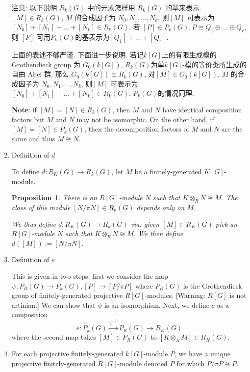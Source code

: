 \documentclass[UTF8]{ctexart}
\newtheorem*{prop}{Proposition}
\begin{document}
\begin{enumerate}
注意: 以下说明 $R_k(G)$ 中的元素怎样用 $R_k(G)$ 的基来表示. $[M]\in R_k(G)$, $M$ 的合成因子为 $N_0,N_1,\ldots,N_k$, 则$[M]$ 可表示为 $[N_0] + [N_1] +\ldots+[N_k]\in R_k(G)$.
若 $[P]\in P_k(G), P\cong Q_1\oplus \ldots\oplus Q_r$, 则 $[P]$ 可用$P_k(G)$的基表示为$[Q_1] + \dots + [Q_r]$.

上面的表述不够严谨. 下面进一步说明. 若记$k[G]$上的有限生成模的 Grothendieck group 为 $G_0(k[G])$,
$R_k(G)$为单$k[G]$-模的等价类所生成的自由 Abel 群, 那么 $G_0(k[G])\cong R_k(G)$, 对$[M]\in G_0(k[G])$, $M$ 的合成因子为 $N_0,N_1,\ldots,N_k$, 则$[M]$ 可表示为 $[N_0] + [N_1] +\ldots+[N_k]\in R_k(G)$.\cite{exact-sequences-and-the-grothendieck-group}
$P_k(G)$的情况同理.\cite{projective-modules-and-the-grothendieck-group}

\textbf{Note}: if $[M] = [N] \in R_k(G)$, then $M$ and $N$ have identical composition factors but $M$ and $N$ may not be isomorphic. On the other hand, if $[M] = [N]\in P_k(G)$, then the decomposition factors of $M$ and $N$ are the same and thus $M\cong N$.


\item Definition of $d$

To define $d : R_K(G) \to R_k(G)$, let $M$ be a finitely-generated $K[G]$-module.

\begin{prop}
There is an $R[G]$-module $N$ such that $K\otimes_R N \cong M$. The class of this module $[N/\pi N]\in R_k(G)$ depends only on $M$.

We thus define $d : R_K(G) \to R_k(G)$ via: given $[M]\in R_K(G)$ pick an $R[G]$-module $N$ such that $K\otimes_R N\cong M$. We then define $d([M]) := [N/\pi N]$.
\end{prop}

\item Definition of $e$

This is given in two steps: first we consider the map $\psi : P_R(G)\to P_k(G), [P]\to [P/\pi P]$ where $P_R(G)$ is the Grothendieck group of finitely-generated projective $R[G]$-modules. [Warning: $R[G]$ is not artinian.] We can show that $\psi$ is an isomorphism. Next, we define $e$ as a composition
\[
e : P_k(G) \overset{\psi^{-1}}{\longrightarrow} P_R(G) \longrightarrow R_K(G)
\]
where the second map takes $[M]\in P_R(G)$ to $[K\otimes_R M]\in R_K(G)$.

\item For each projective finitely-generated $k[G]$-module $P$, we have a unique projective finitely-generated $R[G]$-module denoted $\tilde{P}$ for which $\tilde{P}/\pi\tilde{P}\cong P$.


\end{enumerate}
\end{document}
